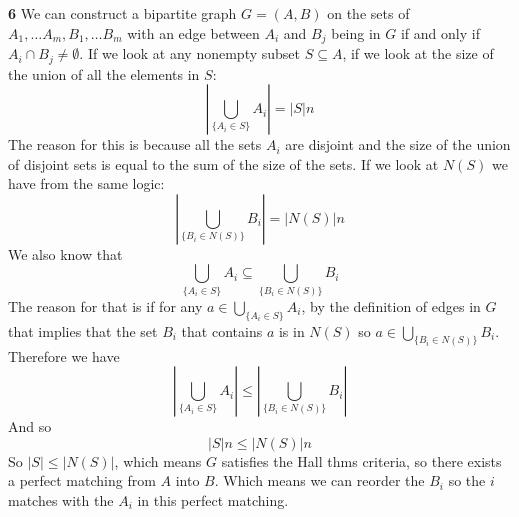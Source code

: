 \documentclass[12pt]{article}
\newenvironment{ques}{\vspace{2 ex}}{\vspace{2 ex}}
\theoremstyle{definition}
\begin{document}
\begin{ques}
	\textbf{6}
		We can construct a bipartite graph $G = (A,B)$ on the sets of
		$A_1, \dots A_m, B_1, \dots B_m$ with an edge between $A_i$ and
		$B_j$ being in $G$ if and only if $A_i \cap B_j \neq \emptyset$.
		If we look at any nonempty subset $S \subseteq A$, if we look
		at the size of the union of all the elements in $S$:
		$$\left|\bigcup_{\{A_i \in S\}}A_i\right| = |S|n$$
		The reason for this is because all the sets $A_i$ are disjoint
		and the size of the union of disjoint sets is equal to the sum
		of the size of the sets. If we look at $N(S)$ we have from the same logic:
		$$\left|\bigcup_{\{B_i \in N(S)\}}B_i\right| = |N(S)|n$$
		We also know that 
		$$\bigcup_{\{A_i \in S\}}A_i \subseteq \bigcup_{\{B_i \in N(S)\}}B_i$$
		The reason for that is if for any $a \in \bigcup_{\{A_i \in
		S\}}A_i$, by the definition of edges in $G$ that implies that
		the set $B_i$ that contains $a$ is in $N(S)$ so $a \in
		\bigcup_{\{B_i \in N(S)\}}B_i$. Therefore we have
		$$\left|\bigcup_{\{A_i \in S\}}A_i\right| \leq
		\left|\bigcup_{\{B_i \in N(S)\}}B_i\right|$$
		And so 
		$$|S|n \leq |N(S)|n$$
		So $|S| \leq |N(S)|$, which means $G$ satisfies the Hall thms
		criteria, so there exists a perfect matching from $A$ into $B$.
		Which means we can reorder the $B_i$ so the $i$ matches with
		the $A_i$ in this perfect matching.
\end{ques}
\end{document}
